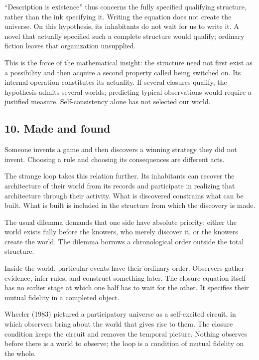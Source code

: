 \documentclass[
  11pt,
]{article}
\begin{document}
``Description is existence'' thus concerns the fully specified
qualifying structure, rather than the ink specifying it. Writing the
equation does not create the universe. On this hypothesis, its
inhabitants do not wait for us to write it. A novel that actually
specified such a complete structure would qualify; ordinary fiction
leaves that organization unsupplied.

This is the force of the mathematical insight: the structure need not
first exist as a possibility and then acquire a second property called
being switched on. Its internal operation constitutes its actuality. If
several closures qualify, the hypothesis admits several worlds;
predicting typical observations would require a justified measure.
Self-consistency alone has not selected our world.

\subsection{10. Made and found}\label{made-and-found}

Someone invents a game and then discovers a winning strategy they did
not invent. Choosing a rule and choosing its consequences are different
acts.

The strange loop takes this relation further. Its inhabitants can
recover the architecture of their world from its records and participate
in realizing that architecture through their activity. What is
discovered constrains what can be built. What is built is included in
the structure from which the discovery is made.

The usual dilemma demands that one side have absolute priority: either
the world exists fully before the knowers, who merely discover it, or
the knowers create the world. The dilemma borrows a chronological order
outside the total structure.

Inside the world, particular events have their ordinary order. Observers
gather evidence, infer rules, and construct something later. The closure
equation itself has no earlier stage at which one half has to wait for
the other. It specifies their mutual fidelity in a completed object.

Wheeler (1983) pictured a participatory universe as a self-excited
circuit, in which observers bring about the world that gives rise to
them. The closure condition keeps the circuit and removes the temporal
picture. Nothing observes before there is a world to observe; the loop
is a condition of mutual fidelity on the whole.
\end{document}
